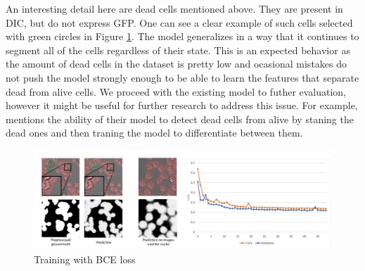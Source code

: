 An interesting detail here are dead cells mentioned above. They are present in DIC, but do not express GFP. One can see a clear example of such cells selected with green circles in Figure \ref{fig:gfp-bce-predictions}. The model generalizes in a way that it continues to segment all of the cells regardless of their state. This is an expected behavior as the amount of dead cells in the dataset is pretty low and ocasional mistakes do not push the model strongly enough to be able to learn the features that separate dead from alive cells. We proceed with the existing model to futher evaluation, however it might be useful for further research to address this issue. For example, \cite{Christiansen_2018} mentions the ability of their model to detect dead cells from alive by staning the dead ones and then traning the model to differentiate between them. 

\begin{figure}[H]
	\begin{center}
		\includegraphics[width=0.8\linewidth]{bilder/gfp/binary-bce/enlarged.png}
		\caption{Training with BCE loss}\label{fig:gfp-bce-predictions}
	\end{center}
\end{figure}
